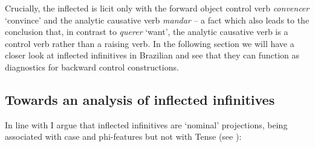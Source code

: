 \documentclass[output=paper]{langsci/langscibook}
\begin{document}
Crucially, the inflected  is licit only with the forward object control verb \textit{convencer} ‘convince’ and the analytic causative verb \textit{mandar} – a fact which also leads to the conclusion that, in contrast to \textit{querer} ‘want’, the analytic causative verb is a control verb rather than a raising verb. In the following section we will have a closer look at inflected infinitives in Brazilian  and see that they can function as diagnostics for backward control constructions.

\subsection{Towards an analysis of inflected infinitives}%

In line with \citet{Raposo1987} I argue that inflected infinitives are ‘nominal’ projections, being associated with case and phi-features but not with Tense (see \citealt{Stowell1982}):

\ea%
    \label{ex:moreno:27}
    \z
\z
\end{document}
